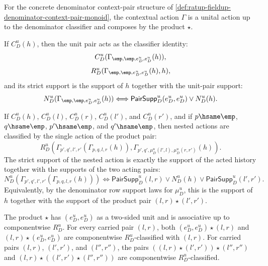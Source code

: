 \begin{theorem}
\label{thm:ratup-fieldup-denominator-context-pair-action-laws}
For the concrete denominator context-pair structure of
\autoref{def:ratup-fieldup-denominator-context-pair-monoid}, the contextual
action $\Gamma$ is a unital action up to the denominator classifier and composes
by the product $\star$.

If $C_D^u(h)$, then the unit pair acts as the classifier identity:
$$
C_D^u(\Gamma_{\emp,\emp,e_D^u,e_D^u}(h)),
$$
$$
R_D^u(\Gamma_{\emp,\emp,e_D^u,e_D^u}(h),h),
$$
and its strict support is the support of $h$ together with the unit-pair
support:
$$
N_D^u(\Gamma_{\emp,\emp,e_D^u,e_D^u}(h))
\Longleftrightarrow
\mathsf{PairSupp}_D^u(e_D^u,e_D^u)\lor N_D^u(h).
$$

If $C_D^u(h)$, $C_D^u(l)$, $C_D^u(r)$, $C_D^u(l')$, and $C_D^u(r')$, and if
$p\hsame\emp$, $q\hsame\emp$, $p'\hsame\emp$, and $q'\hsame\emp$, then nested
actions are classified by the single action of the product pair:
$$
R_D^u(\Gamma_{p',q',l',r'}(\Gamma_{p,q,l,r}(h)),
\Gamma_{p',q',\mu_D^u(l',l),\mu_D^u(r,r')}(h)).
$$
The strict support of the nested action is exactly the support of the acted
history together with the supports of the two acting pairs:
$$
N_D^u(\Gamma_{p',q',l',r'}(\Gamma_{p,q,l,r}(h)))
\Longleftrightarrow
\mathsf{PairSupp}_D^u(l,r)\lor N_D^u(h)\lor\mathsf{PairSupp}_D^u(l',r').
$$
Equivalently, by the denominator row support laws for $\mu_D^u$, this is the
support of $h$ together with the support of the product pair $(l,r)\star(l',r')$.

The product $\star$ has $(e_D^u,e_D^u)$ as a two-sided unit and is associative
up to componentwise $R_D^u$. For every carried pair $(l,r)$, both
$(e_D^u,e_D^u)\star(l,r)$ and $(l,r)\star(e_D^u,e_D^u)$ are componentwise
$R_D^u$-classified with $(l,r)$. For carried pairs $(l,r)$, $(l',r')$, and
$(l'',r'')$, the pairs $((l,r)\star(l',r'))\star(l'',r'')$ and
$(l,r)\star((l',r')\star(l'',r''))$ are componentwise $R_D^u$-classified.
\end{theorem}
